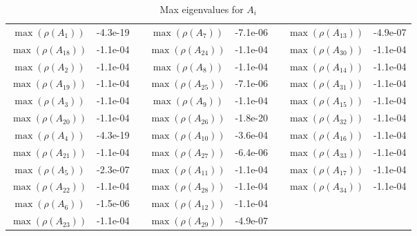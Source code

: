 \begin{table}
\begin{center}
\caption{Max eigenvalues for $A_i$} \vspace{3mm} \label{eig}
\begin{tabular}{|c|c|c|c|c|c|c|c|}\cline{1-2}
\cline{4-5}\cline{7-8}
$\max(\rho(A_1))$&-4.3e-19&&$\max(\rho(A_7))$&-7.1e-06&&$\max(\rho(A_{13}))$&-4.9e-07\\\cline{1-2}\cline{4-5}\cline{7-8}
$\max(\rho(A_{18}))$&-1.1e-04&&$\max(\rho(A_{24}))$&-1.1e-04&&$\max(\rho(A_{30}))$&-1.1e-04\\\cline{1-2}\cline{4-5}\cline{7-8}
$\max(\rho(A_2))$&-1.1e-04&&$\max(\rho(A_8))$&-1.1e-04&&$\max(\rho(A_{14}))$&-1.1e-04\\\cline{1-2}\cline{4-5}\cline{7-8}
$\max(\rho(A_{19}))$&-1.1e-04&&$\max(\rho(A_{25}))$&-7.1e-06&&$\max(\rho(A_{31}))$&-1.1e-04\\\cline{1-2}\cline{4-5}\cline{7-8}
$\max(\rho(A_3))$&-1.1e-04&&$\max(\rho(A_9))$&-1.1e-04&&$\max(\rho(A_{15}))$&-1.1e-04\\\cline{1-2}\cline{4-5}\cline{7-8}
$\max(\rho(A_{20}))$&-1.1e-04&&$\max(\rho(A_{26}))$&-1.8e-20&&$\max(\rho(A_{32}))$&-1.1e-04\\\cline{1-2}\cline{4-5}\cline{7-8}
$\max(\rho(A_4))$&-4.3e-19&&$\max(\rho(A_{10}))$&-3.6e-04&&$\max(\rho(A_{16}))$&-1.1e-04\\\cline{1-2}\cline{4-5}\cline{7-8}
$\max(\rho(A_{21}))$&-1.1e-04&&$\max(\rho(A_{27}))$&-6.4e-06&&$\max(\rho(A_{33}))$&-1.1e-04\\\cline{1-2}\cline{4-5}\cline{7-8}
$\max(\rho(A_5))$&-2.3e-07&&$\max(\rho(A_{11}))$&-1.1e-04&&$\max(\rho(A_{17}))$&-1.1e-04\\\cline{1-2}\cline{4-5}\cline{7-8}
$\max(\rho(A_{22}))$&-1.1e-04&&$\max(\rho(A_{28}))$&-1.1e-04&&$\max(\rho(A_{34}))$&-1.1e-04\\\cline{1-2}\cline{4-5}\cline{7-8}
$\max(\rho(A_6))$&-1.5e-06&&$\max(\rho(A_{12}))$&-1.1e-04&&&\\\cline{1-2}\cline{4-5}\cline{7-8}
$\max(\rho(A_{23}))$&-1.1e-04&&$\max(\rho(A_{29}))$&-4.9e-07&&&\\\cline{1-2}\cline{4-5}\cline{7-8}
\end{tabular}


\end{center}
\end{table}
